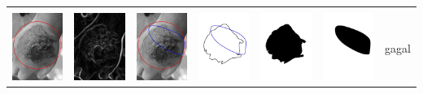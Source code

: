 \begin{table}[H]
\begin{tabular}{|m{0.7in}|m{0.7in}|m{0.7in}|m{0.7in}|m{0.7in}|m{0.7in}|m{0.7in}|}
		&  &  & & & &  \\
		\includegraphics[width=0.7in]{dataset/dataset_3/luka_hitam/ready/31_interp_init.jpg}&
		\includegraphics[width=0.7in]{dataset/dataset_3/luka_hitam/ready/31_interp_ext.jpg}&
		\includegraphics[width=0.7in]{dataset/dataset_3/luka_hitam/ready/31_interp_result.jpg}&
		\includegraphics[width=0.7in]{dataset/dataset_3/luka_hitam/ready/31_gt_r.jpg}&
		\includegraphics[width=0.7in]{dataset/dataset_3/luka_hitam/ready/31_r.jpg}&
		\includegraphics[width=0.7in]{dataset/dataset_3/luka_hitam/ready/31_interp_r.jpg}&
		gagal\\
		\hline
		

\end{tabular}
\end{table}
